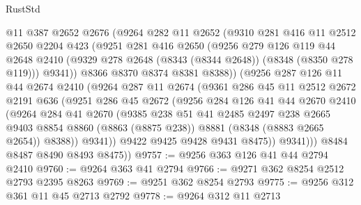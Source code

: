 \begin{lexlean}{RustStd}
\begin{coremodule}
{\begin{coremodule}
{{{{{{{{{{{{{{{{{{{{{{{{{{{{{{{{{{{{{{{{{{{{{{{{{{            @11
            @387
            @2652
            @2676
            (@9264
              @282
              @11
              @2652
              (@9310
                @281
                @416
                @11
                @2512
                @2650
                @2204
                @423
                (@9251
                  @281
                  @416
                  @2650
                  (@9256
                    @279
                    @126
                    @119
                    @44
                    @2648
                    @2410
                    (@9329 @278 @2648 (@8343 (@8344 @2648)) (@8348 (@8350 @278 @119)))
                    @9341))
                @8366
                @8370
                @8374
                @8381
                @8388))
            (@9256
              @287
              @126
              @11
              @44
              @2674
              @2410
              (@9264
                @287
                @11
                @2674
                (@9361
                  @286
                  @45
                  @11
                  @2512
                  @2672
                  @2191
                  @636
                  (@9251
                    @286
                    @45
                    @2672
                    (@9256
                      @284
                      @126
                      @41
                      @44
                      @2670
                      @2410
                      (@9264
                        @284
                        @41
                        @2670
                        (@9385
                          @238
                          @51
                          @41
                          @2485
                          @2497
                          @238
                          @2665
                          @9403
                          @8854
                          @8860
                          (@8863 (@8875 @238))
                          @8881
                          (@8348 (@8883 @2665 @2654))
                          @8388))
                      @9341))
                  @9422
                  @9425
                  @9428
                  @9431
                  @8475))
              @9341)))
        @8484
        @8487
        @8490
        @8493
        @8475))
@9757 := @9256 @363 @126 @41 @44 @2794 @2410
@9760 := @9264 @363 @41 @2794
@9766 := @9271 @362 @8254 @2512 @2793 @2395 @8263
@9769 := @9251 @362 @8254 @2793
@9775 := @9256 @312 @361 @11 @45 @2713 @2792
@9778 := @9264 @312 @11 @2713
}}}}}}}}}}}}}}}}}}}}}}}}}}}}}}}}}}}}}}}}}}}}}}}}}}
\end{coremodule}}
\end{coremodule}
\end{lexlean}
